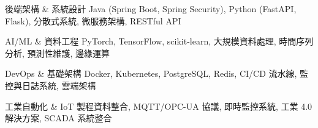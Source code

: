 
\begin{cvskills}
  \cvskill
    {後端架構 \& 系統設計} %
    {Java (Spring Boot, Spring Security), Python (FastAPI, Flask), 分散式系統, 微服務架構, RESTful API} %
    
  \cvskill
    {AI/ML \& 資料工程} %
    {PyTorch, TensorFlow, scikit-learn, 大規模資料處理, 時間序列分析, 預測性維護, 邊緣運算} %
    
  \cvskill
    {DevOps \& 基礎架構} %
    {Docker, Kubernetes, PostgreSQL, Redis, CI/CD 流水線, 監控與日誌系統, 雲端架構} %
    
  \cvskill
    {工業自動化 \& IoT} %
    {製程資料整合, MQTT/OPC-UA 協議, 即時監控系統, 工業 4.0 解決方案, SCADA 系統整合} %
\end{cvskills}
